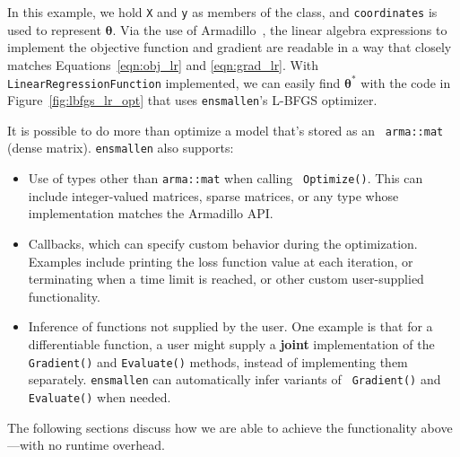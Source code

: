 In this example, we hold {\tt \small X} and {\tt \small y} as members of the
class, and {\tt \small coordinates} is used to represent $\bm \theta$.  Via the
use of Armadillo~\cite{sanderson2016armadillo}, the linear algebra expressions
to implement the objective function and gradient are readable in a way that
closely matches Equations~\ref{eqn:obj_lr} and \ref{eqn:grad_lr}.  With {\tt
\small LinearRegressionFunction} implemented, we can easily find $\bm \theta^*$
with the code in Figure~\ref{fig:lbfgs_lr_opt} that uses {\tt ensmallen}'s
L-BFGS optimizer.

It is possible to do more than optimize a model that's stored as an {\tt
\small arma::mat} (dense matrix).  {\tt ensmallen} also supports:

\begin{itemize}
  \item Use of types other than {\tt \small arma::mat} when calling {\tt \small
Optimize()}.  This can include integer-valued matrices, sparse matrices, or any
type whose implementation matches the Armadillo API.

  \item Callbacks, which can specify custom behavior during the optimization.
Examples include printing the loss function value at each iteration, or
terminating when a time limit is reached, or other custom user-supplied
functionality.

  \item Inference of functions not supplied by the user.  One example is that
for a differentiable function, a user might supply a {\bf joint} implementation
of the {\tt Gradient()} and {\tt Evaluate()} methods, instead of implementing
them separately.  {\tt ensmallen} can automatically infer variants of {\tt
Gradient()} and {\tt Evaluate()} when needed.
\end{itemize}

The following sections discuss how we are able to achieve the
functionality above---with no runtime overhead.
